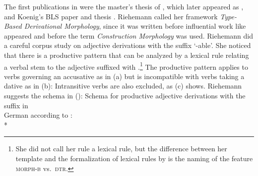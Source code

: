 \documentclass[output=paper
	        ,collection
	        ,collectionchapter
 	        ,biblatex
                ,babelshorthands
                ,newtxmath
                ,draftmode
                ,colorlinks, citecolor=brown
]{langscibook}
\begin{document}
The first publications in  were the
master's thesis of \citet{Riehemann93a}, which later appeared as \citet{Riehemann98a}, and Koenig's BLS paper and thesis
\citep{Koenig93a-u,Koenig94a-u,Koenig99a}. Riehemann called her framework \emph{Type-Based Derivational
  Morphology}, since it was written before influential work like \citet{Goldberg95a} 
appeared and before the term \emph{Construction Morphology} \citep{Booij2005a} was used. Riehemann did a careful corpus study on adjective
derivations with the suffix  `-able'. She noticed that there is a productive pattern
that can be analyzed by a lexical rule relating a verbal stem to the adjective suffixed with
.\footnote{
  She did not call her rule a lexical rule, but the difference between her template and the
  formalization of lexical rules by \citet{Meurers2001a} is the naming of the feature \textsc{morph-b}
  vs.\ \textsc{dtr}.
} The productive pattern applies to verbs governing an accusative as in (a) but
is incompatible with verbs taking a dative as in (b):
\eal
{}
\zl
Intransitive verbs are also excluded, as (c) shows. Riehemann suggests the schema in
():
\ea
\label{ex-schema-bar}
Schema for productive adjective derivations with the suffix  in\\ German according to
\citet[]{Riehemann98a}:\\*
\end{document}
